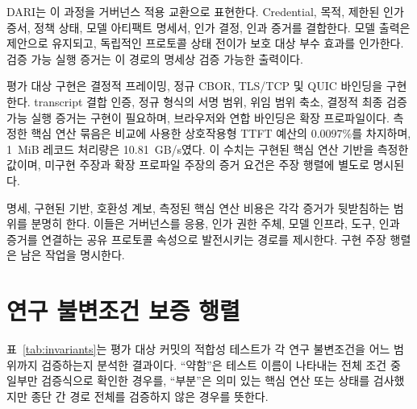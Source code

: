 \documentclass[10pt]{article}
\begin{document}
DARI는 이 과정을 거버넌스 적용 교환으로 표현한다. Credential, 목적, 제한된 인가 증서, 정책 상태, 모델 아티팩트 명세서, 인가 결정, 인과 증거를 결합한다. 모델 출력은 제안으로 유지되고, 독립적인 프로토콜 상태 전이가 보호 대상 부수 효과를 인가한다. 검증 가능 실행 증거는 이 경로의 명세상 검증 가능한 출력이다.

평가 대상 구현은 결정적 프레이밍, 정규 CBOR, TLS/TCP 및 QUIC 바인딩을 구현한다. transcript 결합 인증, 정규 형식의 서명 범위, 위임 범위 축소, 결정적 최종 검증 가능 실행 증거는 구현이 필요하며, 브라우저와 연합 바인딩은 확장 프로파일이다. 측정한 핵심 연산 묶음은 비교에 사용한 상호작용형 TTFT 예산의 0.0097\%를 차지하며, 1~MiB 레코드 처리량은 10.81~GB/s였다. 이 수치는 구현된 핵심 연산 기반을 측정한 값이며, 미구현 주장과 확장 프로파일 주장의 증거 요건은 주장 행렬에 별도로 명시된다.

명세, 구현된 기반, 호환성 계보, 측정된 핵심 연산 비용은 각각 증거가 뒷받침하는 범위를 분명히 한다. 이들은 거버넌스를 응용, 인가 권한 주체, 모델 인프라, 도구, 인과 증거를 연결하는 공유 프로토콜 속성으로 발전시키는 경로를 제시한다. 구현 주장 행렬은 남은 작업을 명시한다.

{\latinaccentfont


}

\clearpage
\onecolumn
\appendix
\section{연구 불변조건 보증 행렬}

\noindent 표~\ref{tab:invariants}는 평가 대상 커밋의 적합성 테스트가 각 연구 불변조건을 어느 범위까지 검증하는지 분석한 결과이다. ``약함''은 테스트 이름이 나타내는 전체 조건 중 일부만 검증식으로 확인한 경우를, ``부분''은 의미 있는 핵심 연산 또는 상태를 검사했지만 종단 간 경로 전체를 검증하지 않은 경우를 뜻한다.
\end{document}
